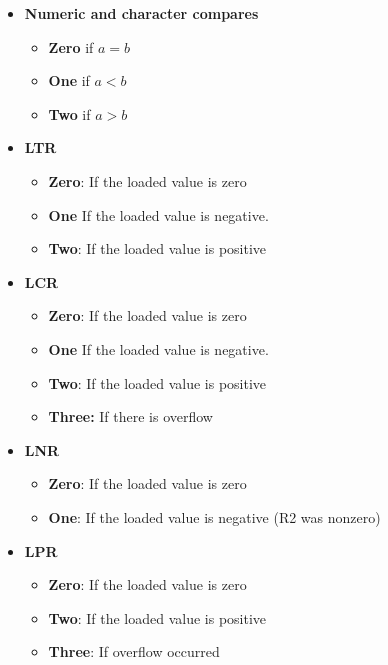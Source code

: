 \documentclass{report}
\begin{document}
    \pagebreak 
    \begin{itemize}
        \item \textbf{Numeric and character compares}
            \begin{itemize}
                \item \textbf{Zero} if $a = b $
                \item \textbf{One} if $a < b $
                \item \textbf{Two} if $a > b$
            \end{itemize}
        \item \textbf{LTR}
            \begin{itemize}
                \item \textbf{Zero}: If the loaded value is zero
                \item \textbf{One} If the loaded value is negative.
                \item \textbf{Two}: If the loaded value is positive
            \end{itemize}
        \item \textbf{LCR}
            \begin{itemize}
                \item \textbf{Zero}: If the loaded value is zero
                \item \textbf{One} If the loaded value is negative.
                \item \textbf{Two}: If the loaded value is positive
                \item \textbf{Three:} If there is overflow
            \end{itemize}
        \item \textbf{LNR}
            \begin{itemize}
                \item \textbf{Zero}: If the loaded value is zero
                \item \textbf{One}: If the loaded value is negative (R2 was nonzero)
            \end{itemize}
        \item \textbf{LPR}
            \begin{itemize}
                \item \textbf{Zero}: If the loaded value is zero
                \item \textbf{Two}: If the loaded value is positive
                \item \textbf{Three}: If overflow occurred

\end{itemize}
\end{itemize}
\end{document}
